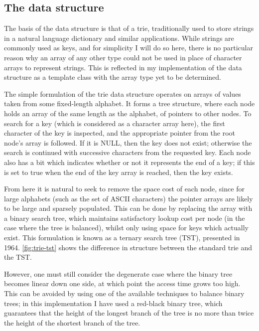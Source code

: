 \documentclass[a4paper,12pt,twoside,openright]{report}
\begin{document}
	\subsection{The data structure}
	
	The basis of the data structure is that of a trie, traditionally used to store strings in a natural language dictionary and similar applications. While strings are commonly used as keys, and for simplicity I will do so here, there is no particular reason why an array of any other type could not be used in place of character arrays to represent strings. This is reflected in my implementation of the data structure as a template class with the array type yet to be determined.
	
	The simple formulation of the trie data structure operates on arrays of values taken from some fixed-length alphabet. It forms a tree structure, where each node holds an array of the same length as the alphabet, of pointers to other nodes. To search for a key (which is considered as a character array here), the first character of the key is inspected, and the appropriate pointer from the root node's array is followed. If it is NULL, then the key does not exist; otherwise the search is continued with successive characters from the requested key. Each node also has a bit which indicates whether or not it represents the end of a key; if this is set to true when the end of the key array is reached, then the key exists.
	
	From here it is natural to seek to remove the space cost of each node, since for large alphabets (such as the set of ASCII characters) the pointer arrays are likely to be large and sparsely populated. This can be done by replacing the array with a binary search tree, which maintains satisfactory lookup cost per node (in the case where the tree is balanced), whilst only using space for keys which actually exist. This formulation is known as a ternary search tree (TST), presented in 1964\cite{Clampett-ternary}. \figurename{ \ref{fig:trie-tst}} shows the difference in structure between the standard trie and the TST.
	
	However, one must still consider the degenerate case where the binary tree becomes linear down one side, at which point the access time grows too high. This can be avoided by using one of the available techniques to balance binary trees; in this implementation I have used a red-black binary tree, which guarantees that the height of the longest branch of the tree is no more than twice the height of the shortest branch of the tree.
	
\end{document}
